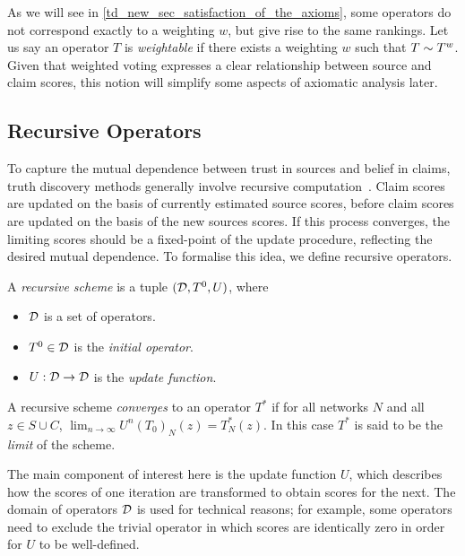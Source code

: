 As we will see in \cref{td_new_sec_satisfaction_of_the_axioms}, some operators do not correspond
exactly to a weighting $w$, but give rise to the same rankings. Let us say an
operator $T$ is \emph{weightable} if there exists a weighting $w$ such that $T
\sim T^{w}$. Given that weighted voting expresses a clear
relationship between source and claim scores, this notion will simplify
some aspects of axiomatic analysis later.

\subsection{Recursive Operators}
\label{td_new_sec_recursive_operators}

To capture the mutual dependence between trust in sources and belief in claims,
truth discovery methods generally involve recursive
computation~\cite{pasternack2010,yin2008,yang_probabilistic_2019,du2019,zhang2018,li2016,galland2010,zhi2015}.
Claim scores are updated on the basis of currently estimated source scores,
before claim scores are updated on the basis of the new sources scores. If this
process converges, the limiting scores should be a fixed-point of the update
procedure, reflecting the desired mutual dependence. To formalise this idea, we
define recursive operators.

\begin{definition}
    \label{td_new_def_recursive_scheme}
    A \emph{recursive scheme} is a tuple $(\mathcal{D}, T^0, U)$, where
    \begin{itemize}
        \item $\mathcal{D}$ is a set of operators.
        \item $T^0 \in \mathcal{D}$ is the \emph{initial operator}.
        \item $U: \mathcal{D} \to \mathcal{D}$ is the \emph{update function}.
    \end{itemize}
    A recursive scheme \emph{converges} to an operator $T^*$ if for all
    networks $N$ and all $z \in S \cup C$, $\lim_{n \to \infty}{U^n(T_0)_N(z)}
    = T^*_N(z)$. In this case $T^*$ is said to be the \emph{limit} of the
    scheme.
\end{definition}

The main component of interest here is the update function $U$, which describes
how the scores of one iteration are transformed to obtain scores for the next.
The domain of operators $\mathcal{D}$ is used for technical reasons; for example, some
operators need to exclude the trivial operator in which scores are identically
zero in order for $U$ to be well-defined.

